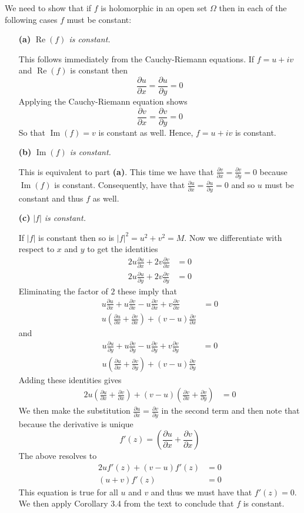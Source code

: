 \documentclass{article}
\newcommand{\der}[2]{\frac{\partial #1}{\partial #2}}
\begin{document}
We need to show that if $f$ is holomorphic in an
open set $\Omega$ then in each of the following cases $f$ must be
constant:
\begin{enumerate}
\item[\textbf{(a)}] \textit{$\operatorname{Re}(f)$ is constant.}

  This follows immediately from the Cauchy-Riemann equations. If $f =
  u +iv$ and $\operatorname{Re}(f)$ is constant then
  \[
  \der{u}{x} = \der{u}{y} = 0
  \]
  Applying the Cauchy-Riemann equation shows
  \[
  \der{v}{x} = \der{v}{y} = 0
  \]
  So that $\operatorname{Im}(f) = v$ is constant as well. Hence, $f =
  u + iv$ is constant.

\item[\textbf{(b)}] \textit{$\operatorname{Im}(f)$ is constant.}

  This is equivalent to part \textbf{(a)}. This time we have that
  $\der{v}{x} = \der{v}{y} = 0$ because $\operatorname{Im}(f)$ is
  constant. Consequently, have that $\der{u}{x} = \der{u}{y} = 0$ and
  so $u$ must be constant and thus $f$ as well.

\item[\textbf{(c)}] \textit{$|f|$ is constant.}

  If $|f|$ is constant then so is $|f|^2 = u^2+v^2 = M$. Now we
  differentiate with respect to $x$ and $y$ to get the identities
  \begin{align*}
    2u\der{u}{x} + 2v\der{v}{x} &= 0 \\
    2u\der{u}{y} + 2v\der{v}{y} &= 0
  \end{align*}
  Eliminating the factor of $2$ these imply that
  \begin{align*}
    u\der{u}{x} + u\der{v}{x} - u\der{v}{x} + v\der{v}{x} &= 0 \\
    u(\der{u}{x} + \der{v}{x}) + (v-u)\der{v}{x}
  \end{align*}
  and
  \begin{align*}
    u\der{u}{y} + u\der{v}{y} - u\der{v}{y} + v\der{v}{y} &= 0 \\
    u(\der{u}{x} + \der{v}{y}) + (v-u)\der{v}{y}
  \end{align*}
  Adding these identities gives
  \begin{align*}
    2u\left(\der{u}{x} + \der{v}{x}\right) + (v-u)\left(\der{v}{x} +
      \der{v}{y}\right) &= 0
  \end{align*}
  We then make the substitution $\der{u}{x} = \der{v}{y}$ in the
  second term and then note that because the derivative is unique
  \[
  f'(z) = \left(\der{u}{x} + \der{v}{x}\right)
  \]
  The above resolves to
  \begin{align*}
    2uf'(z) + (v-u)f'(z) &= 0 \\
    (u+v)f'(z) &= 0
  \end{align*}
  This equation is true for all $u$ and $v$ and thus we must have that
  $f'(z) = 0$. We then apply Corollary 3.4 from the text to conclude
  that $f$ is constant.
\end{enumerate}
\end{document}
